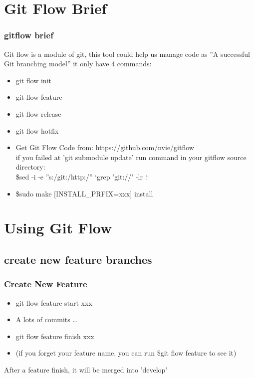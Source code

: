 \documentclass{beamer}
\begin{document}
\section{Git Flow Brief}
\begin{frame}
	\frametitle{gitflow brief}
	Git flow is a module of git, this tool could help us manage code as ''A successful Git branching model'' it only have 4 commands:
	\begin{itemize}
		\item git flow init
		\item git flow feature
		\item git flow release
		\item git flow hotfix
	\end{itemize}
\end{frame}
\begin{frame}
	\begin{itemize}
		\frametitle{Install gitflow}
		\item Get Git Flow Code from: https://github.com/nvie/gitflow \\
			if you failed at 'git submodule update' run command in your gitflow source directory: \\
			\$sed -i -e ''s:/git:\/\//http:\/\//'' `grep 'git://' -lr .`
		\item \$sudo make [INSTALL\_PRFIX=xxx] install
	\end{itemize}
\end{frame}


\section{Using Git Flow}
\subsection{create new feature branches}
\begin{frame}
	\frametitle{Create New Feature}
	\begin{itemize}
		\item git flow feature start xxx
		\item A lots of commits \ldots
		\item git flow feature finish xxx
		\item (if you forget your feature name, you can run \$git flow feature to see it)
	\end{itemize}
	After a feature finish, it will be merged into 'develop'
\end{frame}
\end{document}
